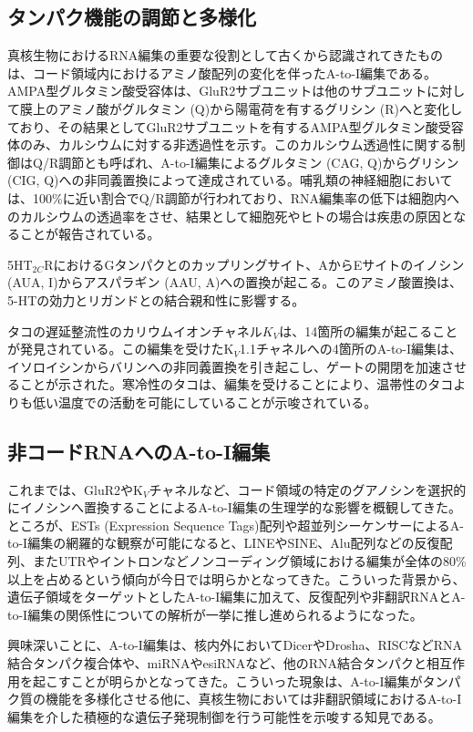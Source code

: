 \subsection{タンパク機能の調節と多様化}
真核生物におけるRNA編集の重要な役割として古くから認識されてきたものは、コード領域内におけるアミノ酸配列の変化を伴ったA-to-I編集である。AMPA型グルタミン酸受容体は、GluR2サブユニットは他のサブユニットに対して膜上のアミノ酸がグルタミン (Q)から陽電荷を有するグリシン (R)へと変化しており、その結果としてGluR2サブユニットを有するAMPA型グルタミン酸受容体のみ、カルシウムに対する非透過性を示す。このカルシウム透過性に関する制御はQ/R調節とも呼ばれ、A-to-I編集によるグルタミン (CAG, Q)からグリシン (CIG, Q)への非同義置換によって達成されている。哺乳類の神経細胞においては、100\%に近い割合でQ/R調節が行われており、RNA編集率の低下は細胞内へのカルシウムの透過率をさせ、結果として細胞死やヒトの場合は疾患の原因となることが報告されている。
\par
5HT$_{2C}$RにおけるGタンパクとのカップリングサイト、AからEサイトのイノシン (AUA, I)からアスパラギン (AAU, A)への置換が起こる。このアミノ酸置換は、5-HTの効力とリガンドとの結合親和性に影響する。
\par
タコの遅延整流性のカリウムイオンチャネル$K_{V}$は、14箇所の編集が起こることが発見されている。この編集を受けたK$_{V}$1.1チャネルへの4箇所のA-to-I編集は、イソロイシンからバリンへの非同義置換を引き起こし、ゲートの開閉を加速させることが示された。寒冷性のタコは、編集を受けることにより、温帯性のタコよりも低い温度での活動を可能にしていることが示唆されている。

\subsection{非コードRNAへのA-to-I編集}
これまでは、GluR2やK$_{V}$チャネルなど、コード領域の特定のグアノシンを選択的にイノシンへ置換することによるA-to-I編集の生理学的な影響を概観してきた。ところが、ESTs (Expression Sequence Tags)配列や超並列シーケンサーによるA-to-I編集の網羅的な観察が可能になると、LINEやSINE、Alu配列などの反復配列、またUTRやイントロンなどノンコーディング領域における編集が全体の80\%以上を占めるという傾向が今日では明らかとなってきた。こういった背景から、遺伝子領域をターゲットとしたA-to-I編集に加えて、反復配列や非翻訳RNAとA-to-I編集の関係性についての解析が一挙に推し進められるようになった。
\par
興味深いことに、A-to-I編集は、核内外においてDicerやDrosha、RISCなどRNA結合タンパク複合体や、miRNAやesiRNAなど、他のRNA結合タンパクと相互作用を起こすことが明らかとなってきた。こういった現象は、A-to-I編集がタンパク質の機能を多様化させる他に、真核生物においては非翻訳領域におけるA-to-I編集を介した積極的な遺伝子発現制御を行う可能性を示唆する知見である。

